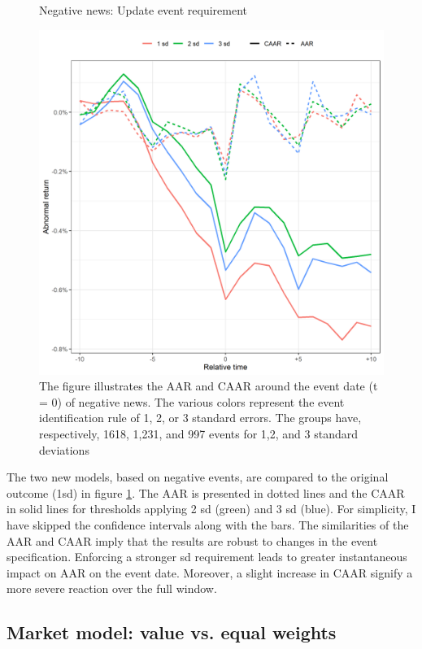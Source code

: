 \begin{figure} [H]
    \centering
    \caption{Negative news: Update event requirement}
    \includegraphics[scale=0.6]{Projekt/1.Figures analysis/ST_negative_sensitivity.png}
     \caption*{\footnotesize The figure illustrates the AAR and CAAR around the event date (t = 0) of negative news. The various colors represent the event identification rule of 1, 2, or 3 standard errors. The groups have, respectively, 1618, 1,231, and 997 events for 1,2, and 3 standard deviations}
    \label{fig:ST_neg_sensitivity}
\end{figure} 

The two new models, based on negative events, are compared to the original outcome (1sd) in figure \ref{fig:ST_neg_sensitivity}. The AAR is presented in dotted lines and the CAAR in solid lines for thresholds applying 2 sd (green) and 3 sd (blue). For simplicity, I have skipped the confidence intervals along with the bars. The similarities of the AAR and CAAR imply that the results are robust to changes in the event specification. Enforcing a stronger sd requirement leads to greater instantaneous impact on AAR on the event date. Moreover, a slight increase in CAAR signify a more severe reaction over the full window. 

\subsection{Market model: value vs. equal weights} \label{sec: sens_st_weights}

